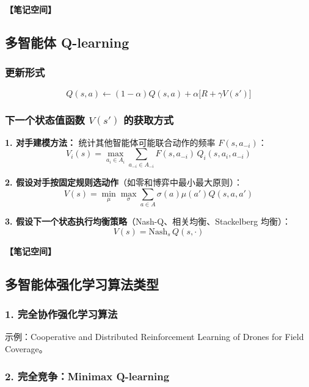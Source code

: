 \documentclass[12pt,a4paper]{article}
\newcommand{\notespace}[1][3cm]{%
  \vspace{#1}%
  \noindent\textbf{【笔记空间】}%
  \vspace{#1}%
}
\newcommand{\1}{\mathbf{1}}
\begin{document}
\notespace[2cm]

\subsection{多智能体 Q-learning}

\subsubsection*{更新形式}

\begin{equation}
Q(s,a)\leftarrow(1-\alpha)Q(s,a)+\alpha\bigl[R+\gamma V(s')\bigr]
\end{equation}

\subsubsection*{下一个状态值函数 $V(s')$ 的获取方式}

\textbf{1. 对手建模方法：} 统计其他智能体可能联合动作的频率 $F(s,a_{-i})$：
\begin{equation}
V_i(s)=\max_{a_i\in A_i}\sum_{a_{-i}\in A_{-i}}F(s,a_{-i})\,Q_i(s,a_i,a_{-i})
\end{equation}

\textbf{2. 假设对手按固定规则选动作}（如零和博弈中最小最大原则）：
\begin{equation}
V(s)=\min_\mu\max_\sigma\sum_{a\in A}\sigma(a)\mu(a')Q(s,a,a')
\end{equation}

\textbf{3. 假设下一个状态执行均衡策略}（Nash-Q、相关均衡、Stackelberg 均衡）：
\begin{equation}
V(s)=\text{Nash}_s\,Q(s,\cdot)
\end{equation}

\notespace[2cm]

\subsection{多智能体强化学习算法类型}

\subsubsection*{1. 完全协作强化学习算法}

示例：Cooperative and Distributed Reinforcement Learning of Drones for Field Coverage。

\subsubsection*{2. 完全竞争：Minimax Q-learning}
\end{document}
